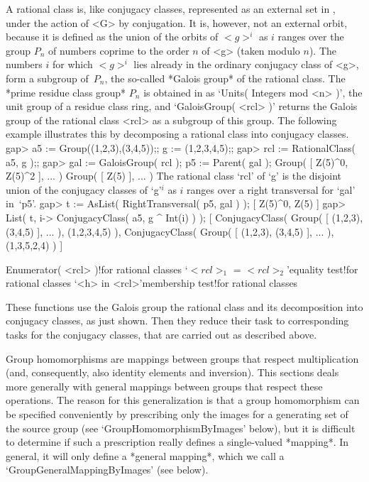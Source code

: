 A rational class  is, like conjugacy classes,  represented as an external
set in {\GAP}, under  the action of <G> by  conjugation. It is,  however,
not an external orbit,  because it is defined  as the union of the orbits
of $<g>^i$ as $i$ ranges  over the group $P_n$  of numbers coprime to the
order $n$ of  <g> (taken modulo $n$).  The numbers $i$  for which $<g>^i$
lies  already in the ordinary  conjugacy  class of  <g>, form a  subgroup
of~$P_n$, the so-called *Galois group*  of the rational class. The *prime
residue class group* $P_n$ is obtained in {\GAP}  as `Units( Integers mod
<n> )', the  unit group of a residue  class ring, and `GaloisGroup( <rcl>
)' returns the Galois group of the rational  class <rcl> as a subgroup of
this  group.   The following  example illustrates   this by decomposing a
rational class into conjugacy classes.
\beginexample
    gap> a5 := Group((1,2,3),(3,4,5));;  g := (1,2,3,4,5);;
    gap> rcl := RationalClass( a5, g );;
    gap> gal := GaloisGroup( rcl );  p5 := Parent( gal );
    Group( [ Z(5)^0, Z(5)^2 ], ... )
    Group( [ Z(5) ], ... )
\endexample
The rational class  `rcl' of `g' is  the disjoint union of the  conjugacy
classes  of  `g'$^i$ as $i$ ranges  over  a  right transversal  for `gal'
in~`p5'.
\beginexample
    gap> t := AsList( RightTransversal( p5, gal ) );
    [ Z(5)^0, Z(5) ]
    gap> List( t, i-> ConjugacyClass( a5, g ^ Int(i) ) );
    [ ConjugacyClass( Group( [ (1,2,3), (3,4,5) ], ... ), (1,2,3,4,5) ), 
      ConjugacyClass( Group( [ (1,2,3), (3,4,5) ], ... ), (1,3,5,2,4) ) ]
\endexample

\>Enumerator( <rcl> )!{for rational classes}
\>`$<rcl>_1$ = $<rcl>_2$'{equality test}!{for rational classes}
\>`<h> in <rcl>'{membership test}!{for rational classes}

These functions   use  the  Galois group  the   rational  class and   its
decomposition into conjugacy  classes, as  just  shown. Then they  reduce
their task  to  corresponding tasks for  the conjugacy  classes, that are
carried out as described above.


Group homomorphisms    are   mappings  between  groups     that   respect
multiplication (and, consequently, also identity elements and inversion).
This sections  deals more generally  with general mappings between groups
that respect these operations. The reason for this generalization is that
a  group homomorphism can be specified  conveniently  by prescribing only
the     images for  a   generating   set    of  the  source   group  (see
`GroupHomomorphismByImages' below),  but it is  difficult to determine if
such a prescription really defines a single-valued *mapping*. In general,
it     will   only define  a     *general  mapping*, which     we  call a
`GroupGeneralMappingByImages' (see below).


